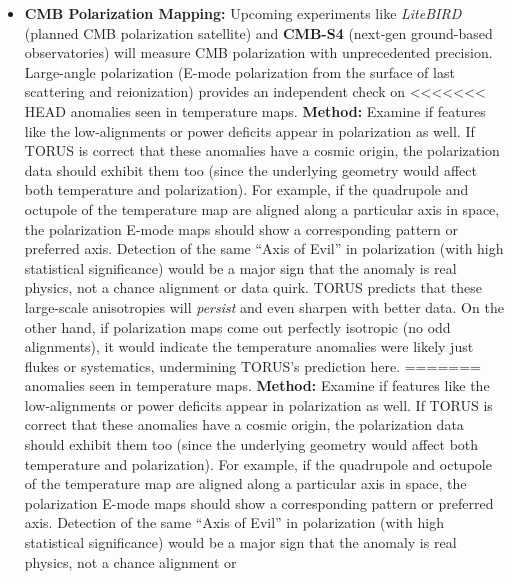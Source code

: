 \documentclass[]{article}
\begin{document}
{\begin{itemize}
  \begin{itemize}
  \item
    \textbf{CMB Polarization Mapping:} Upcoming experiments like
    \emph{LiteBIRD} (planned CMB polarization satellite) and
    \textbf{CMB-S4} (next-gen ground-based observatories) will measure
    CMB polarization with unprecedented precision. Large-angle
    polarization (E-mode polarization from the surface of last
    scattering and reionization) provides an independent check on
<<<<<<< HEAD
    anomalies seen in temperature maps\hspace{0pt}. \textbf{Method:}
    Examine if features like the low-\ell alignments or power deficits
    appear in polarization as well. If TORUS is correct that these
    anomalies have a cosmic origin, the polarization data should exhibit
    them too (since the underlying geometry would affect both
    temperature and polarization). For example, if the quadrupole and
    octupole of the temperature map are aligned along a particular axis
    in space, the polarization E-mode maps should show a corresponding
    pattern or preferred axis\hspace{0pt}. Detection of the same ``Axis
    of Evil'' in polarization (with high statistical significance) would
    be a major sign that the anomaly is real physics, not a chance
    alignment or data quirk\hspace{0pt}. TORUS predicts that these
    large-scale anisotropies will \emph{persist} and even sharpen with
    better data\hspace{0pt}. On the other hand, if polarization maps
    come out perfectly isotropic (no odd alignments), it would indicate
    the temperature anomalies were likely just flukes or systematics,
    undermining TORUS's prediction here\hspace{0pt}.
=======
    anomalies seen in temperature maps​. \textbf{Method:} Examine if
    features like the low-\ell alignments or power deficits appear in
    polarization as well. If TORUS is correct that these anomalies have
    a cosmic origin, the polarization data should exhibit them too
    (since the underlying geometry would affect both temperature and
    polarization). For example, if the quadrupole and octupole of the
    temperature map are aligned along a particular axis in space, the
    polarization E-mode maps should show a corresponding pattern or
    preferred axis​. Detection of the same ``Axis of Evil'' in
    polarization (with high statistical significance) would be a major
    sign that the anomaly is real physics, not a chance alignment or

\end{itemize}
\end{itemize}}
\end{document}
